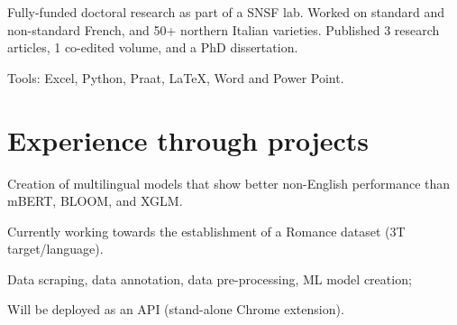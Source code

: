 \documentclass[]{plushcv}
\begin{document}
\begin{minipage}[t]{0.70\textwidth}
Fully-funded doctoral research as part of a SNSF lab. Worked on standard and non-standard French, and 50+ northern Italian varieties. Published 3 research articles, 1 co-edited volume, and a PhD dissertation.
\begin{tightemize}
\item Tools: Excel, Python, Praat, LaTeX, Word and Power Point.
\end{tightemize}
\sectionsep




\section{Experience through projects}

\begin{tightemize}
\item Creation of multilingual models that show better non-English performance than mBERT, BLOOM, and XGLM.
\item Currently working towards the establishment of a Romance dataset (3T target/language). 
\end{tightemize}
\sectionsep

\begin{tightemize}
\item Data scraping, data annotation, data pre-processing, ML model creation;
\item Will be deployed as an API (stand-alone Chrome extension).
\end{tightemize}
\sectionsep


\end{minipage}
\end{document}
